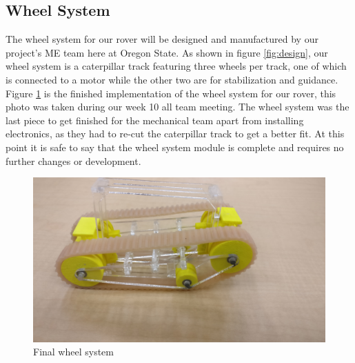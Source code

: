 \documentclass[10pt,letterpaper,onecolumn,draftclsnofoot,journal]{IEEEtran}
\begin{document}
\subsection{Wheel System}
The wheel system for our rover will be designed and manufactured by our project's ME team here at Oregon State. As shown in figure \ref{fig:design}, our wheel system is a caterpillar track featuring three wheels per track, one of which is connected to a motor while the other two are for stabilization and guidance. Figure \ref{fig:rover} is the finished implementation of the wheel system for our rover, this photo was taken during our week 10 all team meeting. The wheel system was the last piece to get finished for the mechanical team apart from installing electronics, as they had to re-cut the caterpillar track to get a better fit. At this point it is safe to say that the wheel system module is complete and requires no further changes or development.

\begin{figure}[H]
	\centering
	\includegraphics[scale = .05]{builtrover.jpg}
	\caption{Final wheel system}
	\label{fig:rover}
\end{figure}
\end{document}
